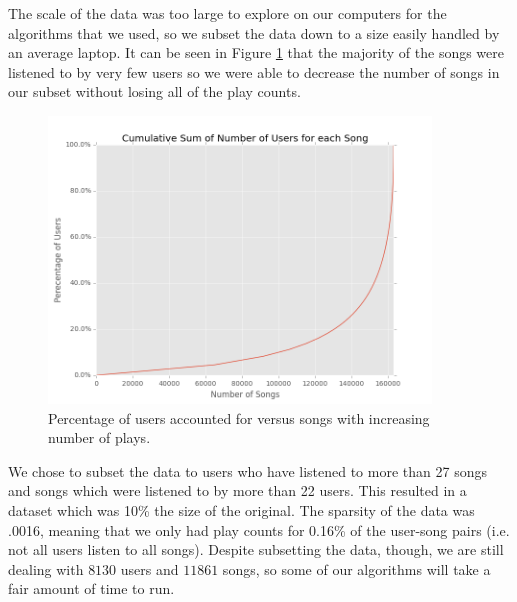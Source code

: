 \documentclass[11pt,preprint]{aastex}
\begin{document}
The scale of the data was too large to explore on our computers for the algorithms that we used, so we subset the data down to a size easily handled by an average laptop. 
It can be seen in Figure \ref{fig:csongs} that the majority of the songs were listened to by very few users so we were able to decrease the number of songs in our subset without losing all of the play counts. 

\begin{figure}[H] %
   \centering
   \includegraphics[width=4in]{../plots/final/cumsum-songs.png} 
   \caption{Percentage of users accounted for versus songs with increasing number of plays.}\label{fig:csongs}
\end{figure}

We chose to subset the data to users who have listened to more than 27 songs and songs which were listened to by more than 22 users. This resulted in a dataset which was 10\% the size of the original. The sparsity of the data was .0016, meaning that we only had play counts for 0.16\% of the user-song pairs (i.e. not all users listen to all songs). Despite subsetting the data, though, we are still dealing with $8130$ users and $11861$ songs, so some of our algorithms will take a fair amount of time to run.


%
\end{document}
